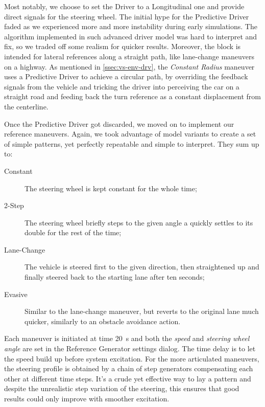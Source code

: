		Most notably, we choose to set the Driver to a Longitudinal one and provide direct signals for the steering wheel. The initial hype for the Predictive Driver faded as
		we experienced more and more instability during early simulations. The algorithm implemented in such advanced driver model was hard to interpret and fix, so we traded
		off some realism for quicker results. Moreover, the block is intended for lateral references along a straight path, like lane-change maneuvers on a highway.
		As mentioned in \vref{ssec:vs-env-drv}, the \emph{Constant Radius} maneuver uses a Predictive Driver to achieve a circular path, by overriding the feedback signals
		from the vehicle and tricking the driver into perceiving the car on a straight road and feeding back the turn reference as a constant displacement from the centerline.

		Once the Predictive Driver got discarded, we moved on to implement our reference maneuvers. Again, we took advantage of \mwSL{} model variants to create a set of
		simple patterns, yet perfectly repeatable and simple to interpret. They sum up to:
		\begin{description}

			\item[Constant] The steering wheel is kept constant for the whole time;

			\item[2-Step] The steering wheel briefly steps to the given angle a quickly settles to its double for the rest of the time;

			\item[Lane-Change] The vehicle is steered first to the given direction, then straightened up and finally steered back to the starting lane after ten seconds;

			\item[Evasive] Similar to the lane-change maneuver, but reverts to the original lane much quicker, similarly to an obstacle avoidance action.

		\end{description}
		
		Each maneuver is initiated at time \SI{20}{\second} and both the \emph{speed} and \emph{steering wheel angle} are set in the Reference Generator settings dialog.
		The time delay is to let the speed build up before system excitation. For the more articulated maneuvers, the steering profile is obtained by a chain of step generators
		compensating each other at different time steps. It's a crude yet effective way to lay a pattern and despite the unrealistic step variation of the steering, this ensures that
		good results could only improve with smoother excitation.


